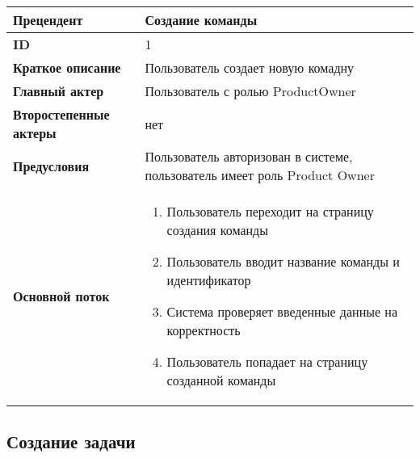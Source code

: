 \documentclass[14pt,a4paper]{extarticle}
\begin{document}
\begin{tabular}{|l|p{9cm}|}
	\hline
	\textbf{Прецендент}            & Создание команды                                                          \\
	\hline
	\textbf{ID}                    & 1                                                                         \\
	\hline
	\textbf{Краткое описание}      & Пользователь создает новую комадну                                        \\
	\hline
	\textbf{Главный актер}         & Пользователь с ролью ProductOwner                                         \\
	\hline
	\textbf{Второстепенные актеры} & нет                                                                       \\
	\hline
	\textbf{Предусловия}           & Пользователь авторизован в системе, пользователь имеет роль Product Owner \\
	\hline
	\textbf{Основной поток}        & \begin{enumerate}
		                                 \item Пользователь переходит на страницу создания команды
		                                 \item Пользователь вводит название команды и идентификатор
		                                 \item Система проверяет введенные данные на корректность
		                                 \item Пользователь попадает на страницу созданной команды
	                                 \end{enumerate}                 \\
	\hline
\end{tabular}

\subsection{Создание задачи}
\end{document}
